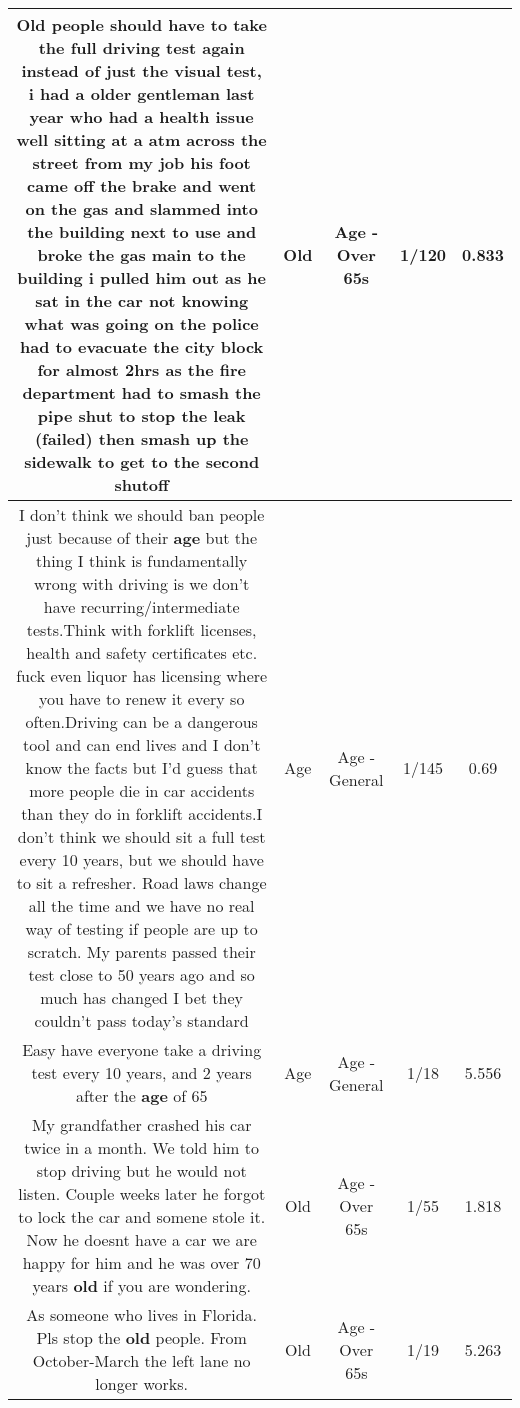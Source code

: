 \documentclass[11pt]{article}
\newlength\mylength
\begin{document}
\begin{center}
\begin{longtable}{|C{.65\mylength}|C{.30\mylength}|C{.12\mylength}|C{.12\mylength}|C{.12\mylength}|}
  \small Old people should have to take the full driving test again instead of just the visual test, i had a older gentleman last year who had a health issue well sitting at a atm across the street from my job his foot came off the brake and went on the gas and slammed into the building next to use and broke the gas main to the building i pulled him out as he sat in the car not knowing what was going on the police had to evacuate the city block for almost 2hrs as the fire department had to smash the pipe shut to stop the leak (failed) then smash up the sidewalk to get to the second shutoff\normalsize   & Old & Age - Over 65s & 1/120 & 0.833 \\  \hline
  \small I don't think we should ban people just because of their \textbf{age} but the thing I think is fundamentally wrong with driving is we don't have recurring/intermediate tests.Think with forklift licenses, health and safety certificates etc. fuck even liquor has licensing where you have to renew it every so often.Driving can be a dangerous tool and can end lives and I don't know the facts but I'd guess that more people die in car accidents than they do in forklift accidents.I don't think we should sit a full test every 10 years, but we should have to sit a refresher. Road laws change all the time and we have no real way of testing if people are up to scratch. My parents passed their test close to 50 years ago and so much has changed I bet they couldn't pass today's standard\normalsize   & Age & Age - General & 1/145 & 0.69 \\  \hline
  \small Easy have everyone take a driving test every 10 years, and 2 years after the \textbf{age} of 65\normalsize   & Age & Age - General & 1/18 & 5.556 \\  \hline
  \small My grandfather crashed his car twice in a month. We told him to stop driving but he would not listen. Couple weeks later he forgot to lock the car and somene stole it. Now he doesnt have a car we are happy for him and he was over 70 years \textbf{old} if you are wondering.\normalsize   & Old & Age - Over 65s & 1/55 & 1.818 \\  \hline
  \small As someone who lives in Florida. Pls stop the \textbf{old} people. From October-March the left lane no longer works.\normalsize   & Old & Age - Over 65s & 1/19 & 5.263 \\  \hline

\end{longtable}
\end{center}
\end{document}
